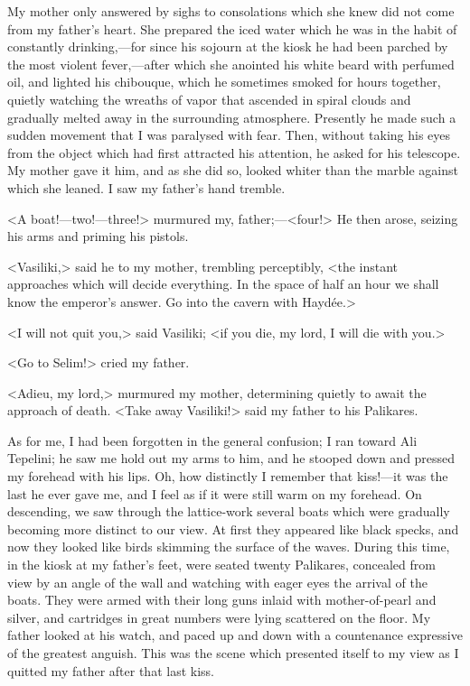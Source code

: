 My mother only answered by sighs to consolations which she knew did not come from my father's heart. She prepared the iced water which he was in the habit of constantly drinking,—for since his sojourn at the kiosk he had been parched by the most violent fever,—after which she anointed his white beard with perfumed oil, and lighted his chibouque, which he sometimes smoked for hours together, quietly watching the wreaths of vapor that ascended in spiral clouds and gradually melted away in the surrounding atmosphere. Presently he made such a sudden movement that I was paralysed with fear. Then, without taking his eyes from the object which had first attracted his attention, he asked for his telescope. My mother gave it him, and as she did so, looked whiter than the marble against which she leaned. I saw my father's hand tremble. 

<A boat!—two!—three!> murmured my, father;—<four!> He then arose, seizing his arms and priming his pistols. 

<Vasiliki,> said he to my mother, trembling perceptibly, <the instant approaches which will decide everything. In the space of half an hour we shall know the emperor's answer. Go into the cavern with Haydée.>

<I will not quit you,> said Vasiliki; <if you die, my lord, I will die with you.>

<Go to Selim!> cried my father. 

<Adieu, my lord,> murmured my mother, determining quietly to await the approach of death. <Take away Vasiliki!> said my father to his Palikares. 

As for me, I had been forgotten in the general confusion; I ran toward Ali Tepelini; he saw me hold out my arms to him, and he stooped down and pressed my forehead with his lips. Oh, how distinctly I remember that kiss!—it was the last he ever gave me, and I feel as if it were still warm on my forehead. On descending, we saw through the lattice-work several boats which were gradually becoming more distinct to our view. At first they appeared like black specks, and now they looked like birds skimming the surface of the waves. During this time, in the kiosk at my father's feet, were seated twenty Palikares, concealed from view by an angle of the wall and watching with eager eyes the arrival of the boats. They were armed with their long guns inlaid with mother-of-pearl and silver, and cartridges in great numbers were lying scattered on the floor. My father looked at his watch, and paced up and down with a countenance expressive of the greatest anguish. This was the scene which presented itself to my view as I quitted my father after that last kiss. 

